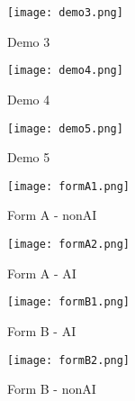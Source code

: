 \begin{figure}[h!]
    \centering
    \texttt{[image: demo3.png]}
    \caption{Demo 3}
    \label{fig:ch7_demo3}
\end{figure}

\begin{figure}[h!]
    \centering
    \texttt{[image: demo4.png]}
    \caption{Demo 4}
    \label{fig:ch7_demo4}
\end{figure}

\begin{figure}[h!]
    \centering
    \texttt{[image: demo5.png]}
    \caption{Demo 5}
    \label{fig:ch7_demo5}
\end{figure}

\begin{figure}[h!]
    \centering
    \texttt{[image: formA1.png]}
    \caption{Form A - nonAI}
    \label{fig:ch7_formA1}
\end{figure}

\begin{figure}[h!]
    \centering
    \texttt{[image: formA2.png]}
    \caption{Form A - AI}
    \label{fig:ch7_formA2}
\end{figure}

\begin{figure}[h!]
    \centering
    \texttt{[image: formB1.png]}
    \caption{Form B - AI}
    \label{fig:ch7_formB1}
\end{figure}

\begin{figure}[h!]
    \centering
    \texttt{[image: formB2.png]}
    \caption{Form B - nonAI}
    \label{fig:ch7_formB2}
\end{figure}